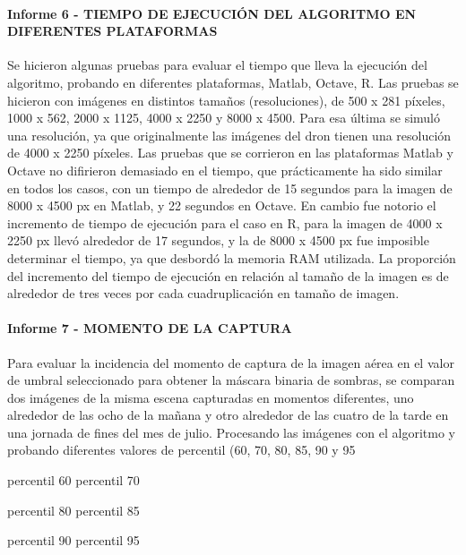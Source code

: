 \paragraph{Informe 6 - TIEMPO DE EJECUCIÓN DEL ALGORITMO EN DIFERENTES PLATAFORMAS}
Se hicieron algunas pruebas para evaluar el tiempo que lleva la ejecución del algoritmo, probando en diferentes plataformas, Matlab, Octave, R. Las pruebas se hicieron con imágenes en distintos tamaños (resoluciones), de 500 x 281 píxeles, 1000 x 562, 2000 x 1125, 4000 x 2250 y 8000 x 4500. Para esa última se simuló una resolución, ya que originalmente las imágenes del dron tienen una resolución de 4000 x 2250 píxeles. Las pruebas que se corrieron en las plataformas Matlab y Octave no difirieron demasiado en el tiempo, que prácticamente ha sido similar en todos los casos, con un tiempo de alrededor de 15 segundos para la imagen de 8000 x 4500 px en Matlab, y 22 segundos en Octave. En cambio fue notorio el incremento de tiempo de ejecución para el caso en R, para la imagen de 4000 x 2250 px llevó alrededor de 17 segundos, y la de 8000 x 4500 px fue imposible determinar el tiempo, ya que desbordó la memoria RAM utilizada. La proporción del incremento del tiempo de ejecución en relación al tamaño de la imagen es de alrededor de tres veces por cada cuadruplicación en tamaño de imagen.


\paragraph{Informe 7 - MOMENTO DE LA CAPTURA}
Para evaluar la incidencia del momento de captura de la imagen aérea en el valor de umbral seleccionado para obtener la máscara binaria de sombras, se comparan dos imágenes de la misma escena capturadas en momentos diferentes, uno alrededor de las ocho de la mañana y otro alrededor de las cuatro de la tarde en una jornada de fines del mes de julio. Procesando las imágenes con el algoritmo y probando diferentes valores de percentil (60, 70, 80, 85, 90 y 95 %



percentil 60	percentil 70



percentil 80	percentil 85



percentil 90	percentil 95



\color{black}


